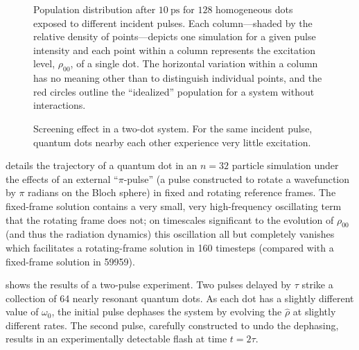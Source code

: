 \documentclass[conference]{IEEEtran}
\begin{document}
\begin{figure}
  \centering
  
  \caption{\label{fig:decoherence}
    Population distribution after $\SI{10}{\pico\second}$ for $128$ homogeneous dots exposed to different incident pulses. 
    Each column---shaded by the relative density of points---depicts one simulation for a given pulse intensity and each point within a column represents the excitation level, $\rho_{00}$, of a single dot.
    The horizontal variation within a column has no meaning other than to distinguish individual points, and the red circles outline the ``idealized'' population for a system without interactions.
  }
\end{figure}

\begin{figure}
  \centering
  
  \caption{\label{fig:screening} Screening effect in a two-dot system.
    For the same incident pulse, quantum dots nearby each other experience very little excitation.
  }
\end{figure}

 details the trajectory of a quantum dot in an $n=32$ particle simulation under the effects of an external ``$\pi$-pulse'' (a pulse constructed to rotate a wavefunction by $\pi$ radians on the Bloch sphere) in fixed and rotating reference frames.
The fixed-frame solution contains a very small, very high-frequency oscillating term that the rotating frame does not; on timescales significant to the evolution of $\rho_{00}$ (and thus the radiation dynamics) this oscillation all but completely vanishes which facilitates a rotating-frame solution in 160 timesteps (compared with a fixed-frame solution in 59959).

 shows the results of a two-pulse experiment.
Two pulses delayed by $\tau$ strike a collection of 64 nearly resonant quantum dots.
As each dot has a slightly different value of $\omega_0$, the initial pulse dephases the system by evolving the $\hat{\rho}$ at slightly different rates.
The second pulse, carefully constructed to undo the dephasing, results in an experimentally detectable flash at time $t = 2\tau$.
\end{document}
